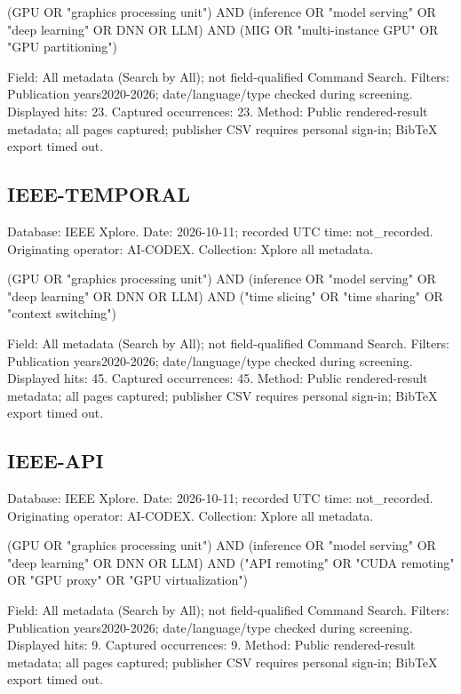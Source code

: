\documentclass[12pt,a4paper]{article}
\begin{document}
{\small\ttfamily\raggedright (GPU OR "graphics processing unit") AND (inference OR "model serving" OR "deep learning" OR DNN OR LLM) AND (MIG OR "multi-instance GPU" OR "GPU partitioning")\par}
Field: All metadata (Search by All); not field-qualified Command Search. Filters: Publication years2020-2026; date/\allowbreak{}language/\allowbreak{}type checked during screening. Displayed hits: 23. Captured occurrences: 23. Method: Public rendered-result metadata; all pages captured; publisher CSV requires personal sign-in; BibTeX export timed out.


\subsection{IEEE-TEMPORAL}
Database: IEEE Xplore. Date: 2026-10-11; recorded UTC time: not\_recorded. Originating operator: AI-CODEX. Collection: Xplore all metadata.


{\small\ttfamily\raggedright (GPU OR "graphics processing unit") AND (inference OR "model serving" OR "deep learning" OR DNN OR LLM) AND ("time slicing" OR "time sharing" OR "context switching")\par}
Field: All metadata (Search by All); not field-qualified Command Search. Filters: Publication years2020-2026; date/\allowbreak{}language/\allowbreak{}type checked during screening. Displayed hits: 45. Captured occurrences: 45. Method: Public rendered-result metadata; all pages captured; publisher CSV requires personal sign-in; BibTeX export timed out.


\subsection{IEEE-API}
Database: IEEE Xplore. Date: 2026-10-11; recorded UTC time: not\_recorded. Originating operator: AI-CODEX. Collection: Xplore all metadata.


{\small\ttfamily\raggedright (GPU OR "graphics processing unit") AND (inference OR "model serving" OR "deep learning" OR DNN OR LLM) AND ("API remoting" OR "CUDA remoting" OR "GPU proxy" OR "GPU virtualization")\par}
Field: All metadata (Search by All); not field-qualified Command Search. Filters: Publication years2020-2026; date/\allowbreak{}language/\allowbreak{}type checked during screening. Displayed hits: 9. Captured occurrences: 9. Method: Public rendered-result metadata; all pages captured; publisher CSV requires personal sign-in; BibTeX export timed out.
\end{document}
